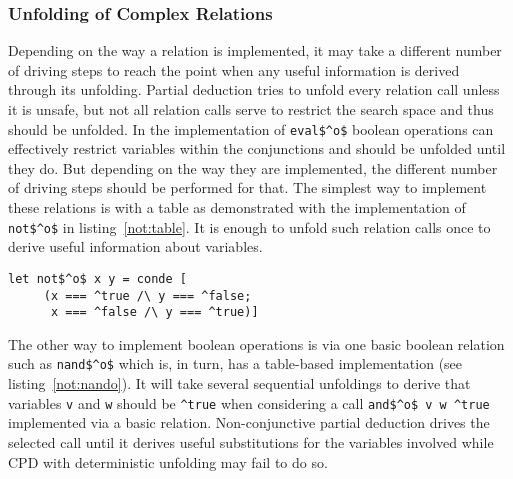 \subsubsection{Unfolding of Complex Relations}

Depending on the way a relation is implemented, it may take a different number of driving steps to reach the point when any useful information is derived through its unfolding.
Partial deduction tries to unfold every relation call unless it is unsafe, but not all relation calls serve to restrict the search space and thus should be unfolded.
In the implementation of \lstinline{eval$^o$} boolean operations can effectively restrict variables within the conjunctions and should be unfolded until they do.
But depending on the way they are implemented, the different number of driving steps should be performed for that.
The simplest way to implement these relations is with a table as demonstrated with the implementation of \lstinline{not$^o$} in listing~\ref{not:table}.
It is enough to unfold such relation calls once to derive useful information about variables.

\begin{figure*}[!h]
  \centering
  \begin{minipage}{0.45\textwidth}
    \begin{lstlisting}[label={not:table}, caption={Implementation of boolean \lstinline{not} as a table}, captionpos=b, frame=tb]
  let not$^o$ x y = conde [
     (x === ^true /\ y === ^false;
      x === ^false /\ y === ^true)]
    \end{lstlisting}
  \end{minipage}
\end{figure*}

The other way to implement boolean operations is via one basic boolean relation such as \lstinline{nand$^o$} which is, in turn, has a table-based implementation (see listing~\ref{not:nando}).
It will take several sequential unfoldings to derive that variables \lstinline{v} and \lstinline{w} should be \lstinline{^true} when considering a call \lstinline{and$^o$ v w ^true} implemented via a basic relation.
Non-conjunctive partial deduction drives the selected call until it derives useful substitutions for the variables involved while CPD with deterministic unfolding may fail to do so.

